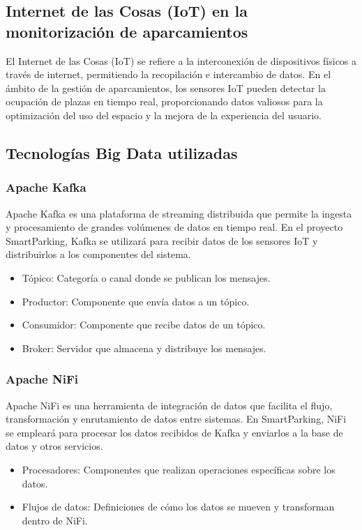 \documentclass{../../../miPlantilla}
\begin{document}
\subsection{Internet de las Cosas (IoT) en la monitorización de aparcamientos}
El Internet de las Cosas (IoT) se refiere a la interconexión de dispositivos físicos a través de internet, permitiendo
la recopilación e intercambio de datos. En el ámbito de la gestión de aparcamientos, los sensores IoT pueden detectar la ocupación
de plazas en tiempo real, proporcionando datos valiosos para la optimización del uso del espacio y la mejora de la experiencia del usuario.

\subsection{Tecnologías Big Data utilizadas}
\subsubsection{Apache Kafka}
Apache Kafka es una plataforma de streaming distribuida que permite la ingesta y procesamiento de grandes volúmenes de datos en tiempo real.
En el proyecto SmartParking, Kafka se utilizará para recibir datos de los sensores IoT y distribuirlos a los componentes del sistema.

\begin{itemize}
  \item Tópico: Categoría o canal donde se publican los mensajes.
  \item Productor: Componente que envía datos a un tópico.
  \item Consumidor: Componente que recibe datos de un tópico.
  \item Broker: Servidor que almacena y distribuye los mensajes.
\end{itemize}

\subsubsection{Apache NiFi}
Apache NiFi es una herramienta de integración de datos que facilita el flujo, transformación y enrutamiento de datos entre sistemas.
En SmartParking, NiFi se empleará para procesar los datos recibidos de Kafka y enviarlos a la base de datos y otros servicios.

\begin{itemize}
  \item Procesadores: Componentes que realizan operaciones específicas sobre los datos.
  \item Flujos de datos: Definiciones de cómo los datos se mueven y transforman dentro de NiFi.
\end{itemize}
\end{document}
